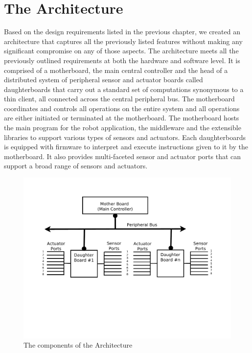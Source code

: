 \section{The Architecture} %
\label{sec:the_architecture}
Based on the design requirements listed in the previous chapter, we created an architecture that captures all the previously listed features without making any significant compromise on any of those aspects. The \xten architecture meets all the previously outlined requirements at both the hardware and software level. It is comprised of a motherboard, the main central controller and the head of a distributed system of peripheral sensor and actuator boards called daughterboards that carry out a standard set of computations synonymous to a thin client, all connected across the central peripheral bus. The motherboard coordinates and controls all operations on the entire system and all operations are either initiated or terminated at the motherboard. The motherboard hosts the main program for the robot application, the middleware and the extensible libraries to support various types of sensors and actuators. Each daughterboards is equipped with firmware to interpret and execute instructions given to it by the motherboard. It also provides multi-faceted sensor and actuator ports that can support a broad range of sensors and actuators. 

\begin{figure}[h]
  \begin{center}
    \includegraphics[width=1.0\columnwidth]{Figures/system_block_diagram.pdf}
    \caption{The components of the \xten Architecture}
  \end{center}
\end{figure}


